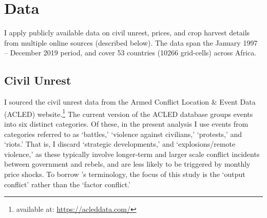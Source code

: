 \documentclass[11pt]{article}
\begin{document}

\section{Data}

I apply publicly available data on civil unrest, prices, and crop harvest details from multiple online sources (described below). The data span the January 1997 -- December 2019 period, and cover 53 countries (10266 grid-cells) across Africa.

\subsection{Civil Unrest}
I sourced the civil unrest data from the Armed Conflict Location \& Event Data (ACLED) website.\footnote{available at: \href{https://acleddata.com/}{https://acleddata.com/}} The current version of the ACLED database groups events into six distinct categories. Of these, in the present analysis I use events from categories referred to as `battles,' `violence against civilians,' `protests,' and `riots.' That is, I discard `strategic developments,' and `explosions/remote violence,' as these typically involve longer-term and larger scale conflict incidents between government and rebels, and are less likely to be triggered by monthly price shocks. To borrow \cite{mcguirk2020}'s terminology, the focus of this study is the `output conflict' rather than the `factor conflict.' 
\end{document}
